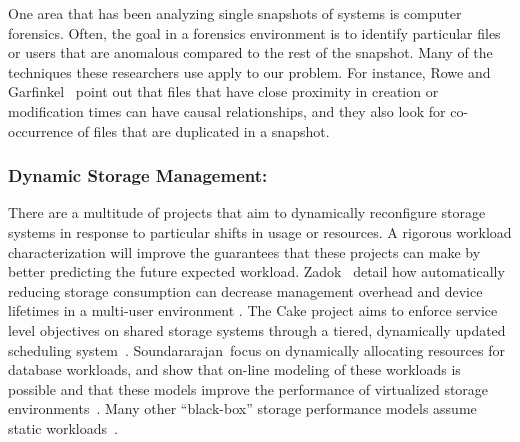 

One area that has been analyzing single snapshots of systems is computer
forensics.  Often, the goal in a forensics environment is to identify particular
files or users that are anomalous compared to the rest of the
snapshot.  Many of the techniques these researchers use apply
to our problem.  For instance, Rowe and Garfinkel~\cite{rowe:icst11} point out that
files that have close proximity in creation or modification times can have
causal relationships, and they also look for co-occurrence of files that are
duplicated in a snapshot.                

\subsubsection*{Dynamic Storage Management: }
There are a multitude of projects that aim to dynamically reconfigure storage
systems in response to particular shifts in usage or resources.  A rigorous
workload characterization will improve the guarantees that these projects can
make by better predicting the future expected workload.  
Zadok \etal{}~detail how automatically reducing storage consumption 
can decrease management overhead and device lifetimes in a multi-user environment
\cite{zadok}.  
The Cake project aims to enforce service level objectives on shared storage
systems through a tiered, dynamically updated scheduling system~\cite{cake}.
Soundararajan~\etal focus on dynamically allocating resources for database
workloads, and show that on-line modeling of these workloads is possible and
that these models improve the performance of virtualized storage
environments~\cite{soundararajan2009dynamic}.  
Many other ``black-box'' storage performance models assume static
workloads~\cite{hippodrome,gulati2011pesto,kelly2004inducing,wang2004storage}.

%


